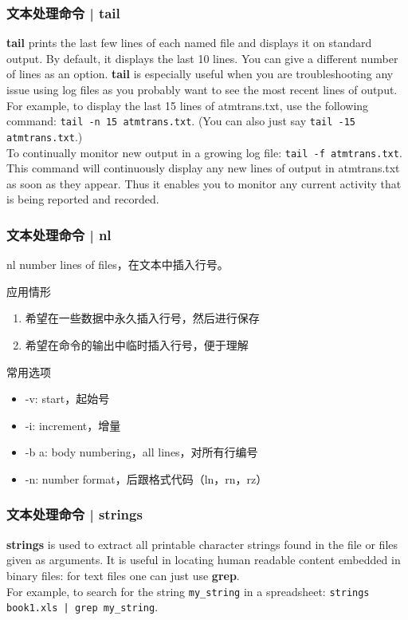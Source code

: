 \begin{frame}[fragile]
  \frametitle{文本处理命令 | tail}
  \textbf{tail} prints the last few lines of each named file and displays it on standard output. By default, it displays the last 10 lines. You can give a different number of lines as an option. \textbf{tail} is especially useful when you are troubleshooting any issue using log files as you probably want to see the most recent lines of output.\\
  \vspace{0.3cm}
  For example, to display the last 15 lines of atmtrans.txt, use the following command: \verb|tail -n 15 atmtrans.txt|. (You can also just say \verb|tail -15 atmtrans.txt|.)\\
  \vspace{0.3cm}
  To continually monitor new output in a growing log file: \verb|tail -f atmtrans.txt|. This command will continuously display any new lines of output in atmtrans.txt as soon as they appear. Thus it enables you to monitor any current activity that is being reported and recorded.
\end{frame}

\begin{frame}
  \frametitle{文本处理命令 | nl}
  \begin{block}{nl}
    number lines of files，在文本中插入行号。
  \end{block}
  \pause
  \begin{block}{应用情形}
    \begin{enumerate}
      \item 希望在一些数据中永久插入行号，然后进行保存
      \item 希望在命令的输出中临时插入行号，便于理解
    \end{enumerate}
  \end{block}
  \pause
  \begin{block}{常用选项}
    \begin{itemize}
      \item -v: start，起始号
      \item -i: increment，增量
      \item -b a: body numbering，all lines，对所有行编号
      \item -n: number format，后跟格式代码（ln，rn，rz）
    \end{itemize}
  \end{block}
\end{frame}

\begin{frame}[fragile]
  \frametitle{文本处理命令 | strings}
  \textbf{strings} is used to extract all printable character strings found in
  the file or files given as arguments. It is useful in locating human
  readable content embedded in binary files: for text files one can just
  use \textbf{grep}.\\
  \vspace{0.3cm}
  For example, to search for the string \verb|my_string| in a spreadsheet: \verb=strings book1.xls | grep my_string=.
\end{frame}


